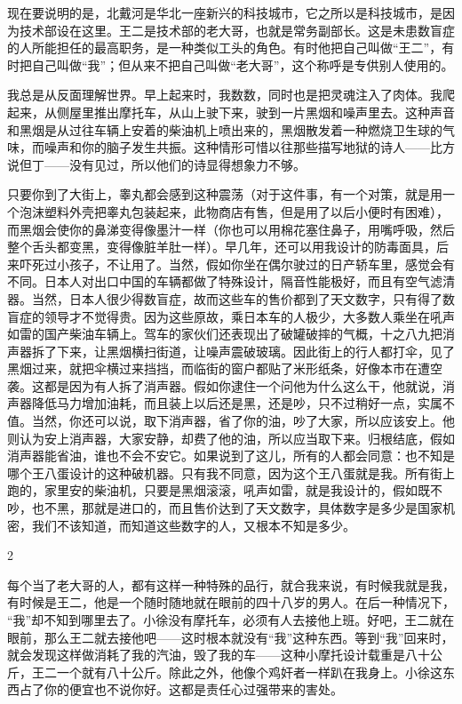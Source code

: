 现在要说明的是，北戴河是华北一座新兴的科技城市，它之所以是科技城市，是因为技术部设在这里。王二是技术部的老大哥，也就是常务副部长。这是未患数盲症的人所能担任的最高职务，是一种类似工头的角色。有时他把自己叫做“王二”，有时把自己叫做“我”；但从来不把自己叫做“老大哥”，这个称呼是专供别人使用的。 

我总是从反面理解世界。早上起来时，我数数，同时也是把灵魂注入了肉体。我爬起来，从侧屋里推出摩托车，从山上驶下来，驶到一片黑烟和噪声里去。这种声音和黑烟是从过往车辆上安着的柴油机上喷出来的，黑烟散发着一种燃烧卫生球的气味，而噪声和你的脑子发生共振。这种情形可惜以往那些描写地狱的诗人——比方说但丁——没有见过，所以他们的诗显得想象力不够。 

只要你到了大街上，睾丸都会感到这种震荡（对于这件事，有一个对策，就是用一个泡沫塑料外壳把睾丸包装起来，此物商店有售，但是用了以后小便时有困难），而黑烟会使你的鼻涕变得像墨汁一样（你也可以用棉花塞住鼻子，用嘴呼吸，然后整个舌头都变黑，变得像脏羊肚一样）。早几年，还可以用我设计的防毒面具，后来吓死过小孩子，不让用了。当然，假如你坐在偶尔驶过的日产轿车里，感觉会有不同。日本人对出口中国的车辆都做了特殊设计，隔音性能极好，而且有空气滤清器。当然，日本人很少得数盲症，故而这些车的售价都到了天文数字，只有得了数盲症的领导才不觉得贵。因为这些原故，乘日本车的人极少，大多数人乘坐在吼声如雷的国产柴油车辆上。驾车的家伙们还表现出了破罐破摔的气概，十之八九把消声器拆了下来，让黑烟横扫街道，让噪声震破玻璃。因此街上的行人都打伞，见了黑烟过来，就把伞横过来挡挡，而临街的窗户都贴了米形纸条，好像本市在遭空袭。这都是因为有人拆了消声器。假如你逮住一个问他为什么这么干，他就说，消声器降低马力增加油耗，而且装上以后还是黑，还是吵，只不过稍好一点，实属不值。当然，你还可以说，取下消声器，省了你的油，吵了大家，所以应该安上。他则认为安上消声器，大家安静，却费了他的油，所以应当取下来。归根结底，假如消声器能省油，谁也不会不安它。如果说到了这儿，所有的人都会同意：也不知是哪个王八蛋设计的这种破机器。只有我不同意，因为这个王八蛋就是我。所有街上跑的，家里安的柴油机，只要是黑烟滚滚，吼声如雷，就是我设计的，假如既不吵，也不黑，那就是进口的，而且售价达到了天文数字，具体数字是多少是国家机密，我们不该知道，而知道这些数字的人，又根本不知是多少。 



2 

每个当了老大哥的人，都有这样一种特殊的品行，就合我来说，有时候我就是我，有时候是王二，他是一个随时随地就在眼前的四十八岁的男人。在后一种情况下， “我”却不知到哪里去了。小徐没有摩托车，必须有人去接他上班。好吧，王二就在眼前，那么王二就去接他吧——这时根本就没有“我”这种东西。等到“我”回来时，就会发现这样做消耗了我的汽油，毁了我的车——这种小摩托设计载重是八十公斤，王二一个就有八十公斤。除此之外，他像个鸡奸者一样趴在我身上。小徐这东西占了你的便宜也不说你好。这都是责任心过强带来的害处。 

